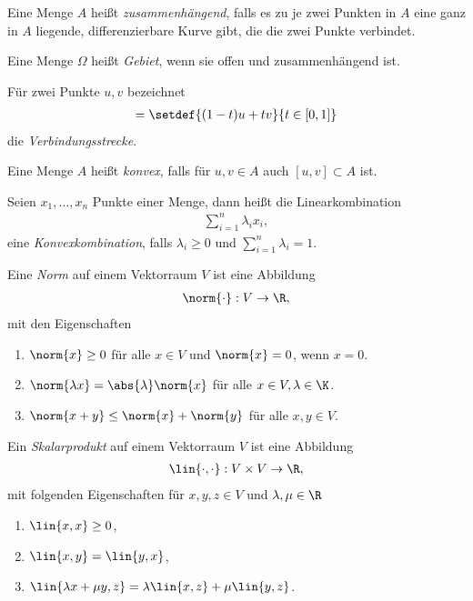 \begin{defn}
Eine Menge $A$ heißt \emph{zusammenhängend}, falls es zu je zwei Punkten in $A$
eine ganz in $A$ liegende, differenzierbare Kurve gibt, die die zwei Punkte
verbindet.
\end{defn}
\begin{defn}
Eine Menge $\Omega$ heißt \emph{Gebiet}, wenn sie offen und zusammenhängend ist.
\end{defn}
\begin{defn}
Für zwei Punkte $u,v$ bezeichnet
\begin{align*}
[u,v] = \setdef{(1-t)u+tv}{t\in[0,1]}
\end{align*}
die \emph{Verbindungsstrecke}.
\end{defn}
\begin{defn}
Eine Menge $A$ heißt \emph{konvex}, falls für $u,v\in A$ auch $[u,v]\subset A$
ist.
\end{defn}
\begin{defn}
Seien $x_1, \ldots, x_n$ Punkte einer Menge, dann heißt die
Linearkombination
\begin{align*}
\sum\limits_{i=1}^n \lambda_i x_i,
\end{align*}
eine \emph{Konvexkombination}, falls $\lambda_i \ge 0$ und $\sum\limits_{i=1}^n
\lambda_i = 1$.
\end{defn}

\begin{defn}
Eine \emph{Norm} auf einem Vektorraum $V$ ist eine Abbildung
\begin{align*}
\norm{\cdot}: V\to \R,
\end{align*}
mit den Eigenschaften
\begin{enumerate}
  \item $\norm{x} \ge 0$ für alle $x\in V$ und $\norm{x} = 0$, wenn $x = 0$.
  \item $\norm{\lambda x} = \abs{\lambda}\norm{x}$ für alle $x\in
  V,\lambda\in\K$.
  \item $\norm{x + y} \le \norm{x} + \norm{y}$ für alle $x,y\in V$.
\end{enumerate}
\end{defn}
\begin{defn}
Ein \emph{Skalarprodukt} auf einem Vektorraum $V$ ist eine Abbildung
\begin{align*}
\lin{\cdot,\cdot}: V\times V\to \R,
\end{align*}
mit folgenden Eigenschaften für $x,y,z\in V$ und $\lambda,\mu\in\R$
\begin{enumerate}
  \item $\lin{x,x} \ge 0$,
  \item $\lin{x,y} = \lin{y,x}$,
  \item $\lin{\lambda x + \mu y,z} = \lambda\lin{x,z}+\mu\lin{y,z}$.
\end{enumerate}
\end{defn}

